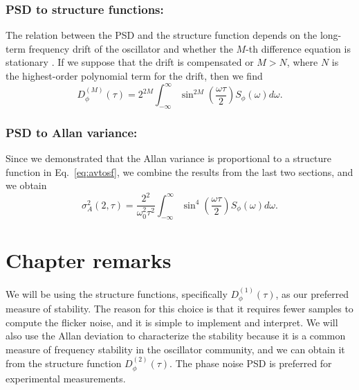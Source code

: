 \subsubsection*{PSD to structure functions:}
%
The relation between the PSD and the structure function depends on the long-term frequency drift of the oscillator and whether the $M$-th difference equation is stationary \cite{Lindsey1976}. If we suppose that the drift is compensated or $M > N$, where $N$ is the highest-order polynomial term for the drift, then we find
%
\begin{equation}
	D_\phi^{(M)}(\tau) = 2^{2M}\int_{-\infty}^{\infty} \sin^{2M}\left( \frac{\omega\tau}{2}\right) S_\phi(\omega) d\omega.
\end{equation}

\subsubsection*{PSD to Allan variance:}
%
Since we demonstrated that the Allan variance is proportional to a structure function in Eq.~\ref{eq:avtosf}, we combine the results from the last two sections, and we obtain
%
\begin{equation}
\sigma_A^2(2,\tau) = \frac{2^2}{\omega_0^2\tau^2} \int_{-\infty}^{\infty} \sin^4\left( \frac{\omega\tau}{2} \right) S_\phi(\omega) d\omega.
\end{equation}

\section{Chapter remarks} \label{sec:2conc}
%
We will be using the structure functions, specifically $D^{(1)}_\phi(\tau)$, as our preferred measure of stability. The reason for this choice is that it requires fewer samples to compute the flicker noise, and it is simple to implement and interpret. We will also use the Allan deviation to characterize the stability because it is a common measure of frequency stability in the oscillator community, and we can obtain it from the structure function $D_\phi^{(2)}(\tau)$. The phase noise PSD is preferred for experimental measurements.

